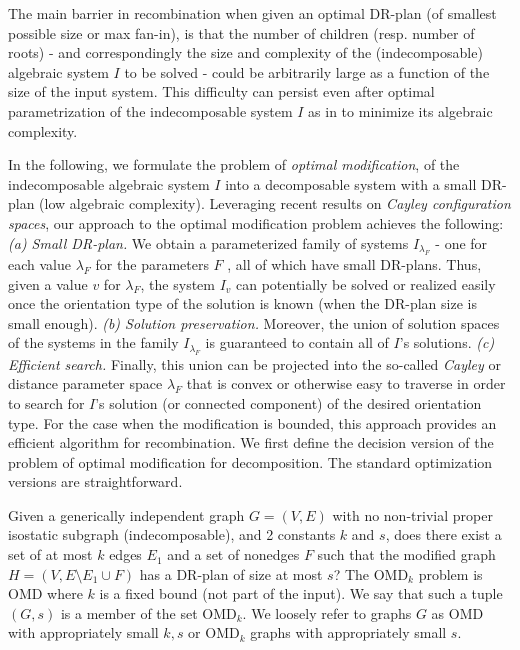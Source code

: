 The main barrier in recombination when given an optimal DR-plan (of smallest possible
size or max fan-in),  is that the number of children (resp. number of
roots) - and correspondingly the  size and complexity of the (indecomposable) algebraic
system $I$ to be solved -
could be arbitrarily large as a function of the size of the input system.
This difficulty can persist even after optimal parametrization of the
indecomposable system $I$ as in \cite{XX}
to minimize its algebraic complexity.

In the following, we formulate the problem of {\em optimal
modification},
of the indecomposable
algebraic system $I$ into a decomposable system with a small DR-plan (low
algebraic complexity).
Leveraging recent results on {\em Cayley
configuration spaces}, our approach to the optimal modification problem
achieves the following: {\em (a) Small DR-plan.} We obtain a  parameterized family of systems
$I_{\lambda_F}$ -  one for each value $\lambda_F$ for the parameters $F$ ,  all of which have
small DR-plans. Thus, given a value $v$ for $\lambda_F$, the system $I_v$ can
potentially be solved or realized easily once the orientation type of the solution
is known  (when the DR-plan size is small enough).
{\em (b) Solution preservation.} Moreover, the union of solution spaces of the systems in the family
$I_{\lambda_F}$
is guaranteed to contain
all of $I$'s solutions. {\em (c) Efficient search.} Finally, this union can be projected into the
so-called {\em Cayley} or distance parameter space $\lambda_F$ that is convex
or otherwise easy to traverse in order to search for $I$'s solution
(or connected component)
of the desired orientation type.
For the case when the modification is bounded, this approach provides an efficient
algorithm for recombination. We first define the decision version of the
problem of optimal modification
for decomposition. The standard optimization versions are straightforward.

\medskip{} Given a generically
independent graph $G = (V,E)$
with no non-trivial proper isostatic subgraph (indecomposable), and 2 constants $k$ and $s$,
does there exist a set of at most $k$  edges $E_1$ and a set of nonedges $F$
such that the modified graph $H = (V, E\setminus E_1 \cup F)$ has a DR-plan
of size at most $s$?  The OMD$_k$ problem is  OMD where $k$ is a fixed bound (not
part of the input).   We say that such a tuple $(G,s)$ is a member of the
set OMD$_k$. We loosely refer to graphs $G$ as OMD with appropriately small $k,s$ or OMD$_k$ graphs
with appropriately small $s$.


